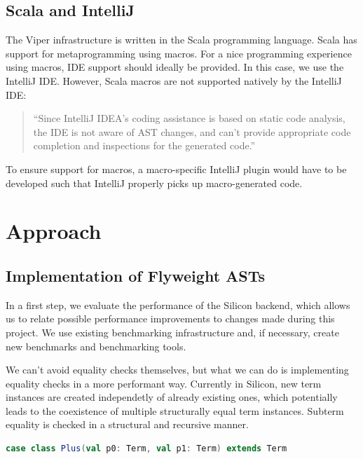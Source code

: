 \documentclass[11pt]{article}
\begin{document}
    \subsection{Scala and IntelliJ} \label{background:scala}

    The Viper infrastructure is written in the Scala programming language.
    Scala has support for metaprogramming using macros. For a nice programming experience
    using macros, IDE support should ideally be provided. In this case, we use the IntelliJ IDE.
    However, Scala macros are not supported natively by the IntelliJ IDE:
    \begin{quote}
        ``Since IntelliJ IDEA’s coding assistance is based on static code analysis,
        the IDE is not aware of AST changes, and can’t provide appropriate code
        completion and inspections for the generated code.'' \cite{intellij}
    \end{quote}

    To ensure support for macros, a macro-specific IntelliJ plugin would have to be developed such that
    IntelliJ properly picks up macro-generated code.

    \section{Approach} \label{approach}

    \subsection{Implementation of Flyweight ASTs} \label{approach:flyweight}

    In a first step, we evaluate the performance of the Silicon backend,
    which allows us to relate possible performance improvements to 
    changes made during this project. We use existing benchmarking infrastructure 
    and, if necessary, create new benchmarks and benchmarking tools.

    We can't avoid equality checks themselves, but what we can do is implementing
    equality checks in a more performant way. Currently in Silicon, new term instances are
    created independetly of already existing ones, which potentially leads 
    to the coexistence of multiple structurally equal term instances. Subterm equality is checked in a
    structural and recursive manner.

\begin{lstlisting}[language=Scala, caption={Simplification of how term instances currently are
    implemented. Because \texttt{Plus} is defined as a case class, the compiler automatically
    generates code for recursive structural equality checking.}]
case class Plus(val p0: Term, val p1: Term) extends Term
\end{lstlisting}
        
\end{document}
